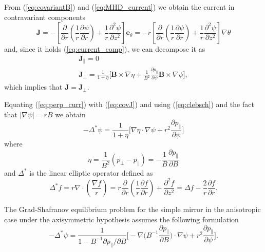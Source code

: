 From (\ref{eq:covariantB}) and (\ref{eq:MHD_current}) we obtain the current in contravariant components
\begin{equation}\label{eq:covJ}
  \mathbf{J}=-\left[\frac{\partial}{\partial r} \left(\frac{1}{r} \frac{\partial \psi}{\partial r}\right) + \frac{1}{r} \frac{\partial^2 \psi}{\partial z^2}\right]\mathbf{e}_\theta=
  -r\left[\frac{\partial}{\partial r} \left(\frac{1}{r} \frac{\partial \psi}{\partial r}\right) + \frac{1}{r} \frac{\partial^2 \psi}{\partial z^2}\right]\nabla\theta
\end{equation}
and, since it holds (\ref{eq:current_comp}), we can decompose it as
\begin{subequations}\label{eq:plasma_current}
  \begin{align}
    \mathbf{J}_\parallel=0\\
    \label{eq:perp_curr}\mathbf{J}_\perp=\frac{1}{1+\eta}\bigg[\mathbf{B}\times\nabla\eta+\frac{1}{B^2}\frac{\partial p_\parallel}{\partial \psi}\mathbf{B}\times\nabla\psi\bigg],
  \end{align}
\end{subequations}
which implies that $\mathbf{J}=\mathbf{J}_\perp$.

Equating (\ref{eq:perp_curr}) with (\ref{eq:covJ}) and using (\ref{eq:clebsch}) and the fact that $|\nabla\psi|=rB$ we obtain
\begin{equation}\label{eq:GS_operator}
 -\Delta^*\psi=\frac{1}{1+\eta}\bigg[\nabla\eta\cdot\nabla\psi+r^2\frac{\partial p_\parallel}{\partial \psi}\bigg]
\end{equation}
where
\begin{equation}
  \eta=\frac{1}{B^2}(p_\perp-p_\parallel)=-\frac{1}{B}\frac{\partial p_\parallel}{\partial B}
\end{equation}
 and $\Delta^*$ is the linear elliptic operator defined as
\begin{equation}
  \Delta^*f=r\nabla\cdot\left(\frac{\nabla f}{r}\right)=r\frac{\partial }{\partial r} \left(\frac{1}{r} \frac{\partial f}{\partial r}\right) + \frac{\partial^2 f}{\partial z^2}=
  \Delta f -\frac{2}{r}\frac{\partial f}{\partial r}.
\end{equation}

The Grad-Shafranov equilibrium problem for the simple mirror in the anisotropic case under the axisymmetric hypothesis assumes the following formulation
\begin{equation}\label{eq:GS_eq}
  -\Delta^*\psi=\frac{1}{1-B^{-1}\partial p_\parallel/\partial B}\bigg[-\nabla \Big(B^{-1}\frac{\partial p_\parallel}{\partial B}\Big)\cdot\nabla\psi+
  r^2\frac{\partial p_\parallel}{\partial \psi}\bigg].
\end{equation}

